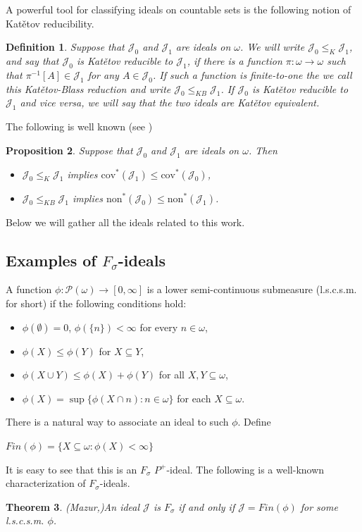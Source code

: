 \documentclass[a4paper]{amsart}
\newtheorem{theorem}{Theorem}[section]
\newtheorem{proposition}[theorem]{Proposition}
\newtheorem{definition}[theorem]{Definition}
\newcommand{\J}{\mathcal{J}}
\begin{document}
A powerful tool for classifying ideals on countable sets is the following notion of Katětov reducibility.
\begin{definition}
    Suppose that $\J_{0}$ and $\J_{1}$ are ideals on $\omega$. We will write $\J_{0}\leq_{K}\J_{1}$, and say that $\J_{0}$ is Katětov reducible to $\J_{1}$, if there is a function $\pi:\omega\rightarrow\omega$ such that $\pi^{-1}[A]\in\J_{1}$ for any $A\in\J_{0}$. If such a function is finite-to-one the we call this Katětov-Blass reduction and write $\J_{0}\leq_{KB}\J_{1}$. If $\J_{0}$ is Katětov reducible to $\J_{1}$ and vice versa, we will say that the two ideals are Katětov equivalent.
\end{definition}
The following is well known (see \cite{Hrus})
\begin{proposition}\label{NonKatětov}
    Suppose that $\J_{0}$ and $\J_{1}$ are ideals on $\omega$. Then
    \begin{itemize}
        \item $\J_{0}\leq_{K}\J_{1}$ implies $\mathrm{cov}^*(\J_{1})\leq \mathrm{cov}^*(\J_{0})$,
        \item $\J_{0}\leq_{KB}\J_{1}$ implies $\mathrm{non}^*(\J_{0})\leq \mathrm{non}^*(\J_{1})$.
    \end{itemize}
\end{proposition}
Below we will gather all the ideals related to this work.

\subsection{Examples of $F_{\sigma}$-ideals}
A function $\phi:\mathcal{P}(\omega)\rightarrow[0,\infty]$ is a lower semi-continuous submeasure (l.s.c.s.m. for short) if the following conditions hold:
\begin{itemize}
    \item[--] $\phi(\emptyset)=0$, $\phi(\{n\})<\infty$ for every $n\in\omega$,
    \item[--]   $\phi(X)\leq\phi(Y)$ for $X\subseteq Y$,
    \item[--]  $\phi(X\cup Y)\leq\phi(X)+\phi(Y)$ for all $X, Y\subseteq\omega$,
    \item[--] $\phi(X)=\sup\{\phi(X\cap n):n\in\omega\}$ for each $X\subseteq\omega$.
\end{itemize}
There is a natural way to associate an ideal to such $\phi$. Define 
\begin{center}
    $Fin(\phi)=\{X\subseteq\omega:\phi(X)<\infty\}$
\end{center}
It is easy to see that this is an $F_{\sigma}$ $P^{+}$-ideal. The following is a well-known characterization of $F_{\sigma}$-ideals.
\begin{theorem}(Mazur,\cite{Mazur})\label{Mazur}
    An ideal $\J$ is $F_{\sigma}$ if and only if $\J=Fin(\phi)$ for some l.s.c.s.m. $\phi$.
\end{theorem}
\end{document}
